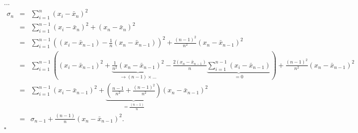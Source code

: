 
    \item ...\\
    \begin{eqnarray*} 
        \sigma_n &=& \sum_{i = 1}^n (x_i - \bar{x}_n)^2 \\
        &=& \sum_{i = 1}^{n - 1} (x_ i - \bar{x}_n)^2 + (x_n - \bar{x}_n)^2 \\
        &=& \sum_{i = 1}^{n - 1} \left( (x_i - \bar{x}_{n - 1}) - \frac{1}{n} (x_n - \bar{x}_{n - 1}) \right)^2 + \frac{(n - 1)^2}{n^2} (x_n - \bar{x}_{n - 1})^2 \\
        &=& \sum_{i = 1}^{n - 1} \left( (x_i - \bar{x}_{n - 1})^2 + \underbrace{\frac{1}{n^2}(x_n - \bar{x}_{n - 1})^2}_{\rightarrow (n - 1) \times …} - \frac{2(x_n - \bar{x}_{n - 1})}{n} \underbrace{\sum_{i = 1}^{n - 1} (x_i - \bar{x}_{n - 1})}_{= 0}  \right) + \frac{(n - 1)^2}{n^2} (x_n - \bar{x}_{n - 1})^2 \\
        &=& \sum_{i = 1}^{n - 1} (x_i - \bar{x}_{n - 1})^2 + \underbrace{\left( \frac{n - 1}{n^2} + \frac{(n - 1)^2}{n^2}\right)}_{= \frac{(n - 1)}{n}} (x_n - \bar{x}_{n - 1})^2 \\
        &=&  \sigma_{n - 1} + \frac{(n - 1)}{n} (x_n - \bar{x}_{n - 1})^2.\\
    \end{eqnarray*} 
    \hfill$\square$